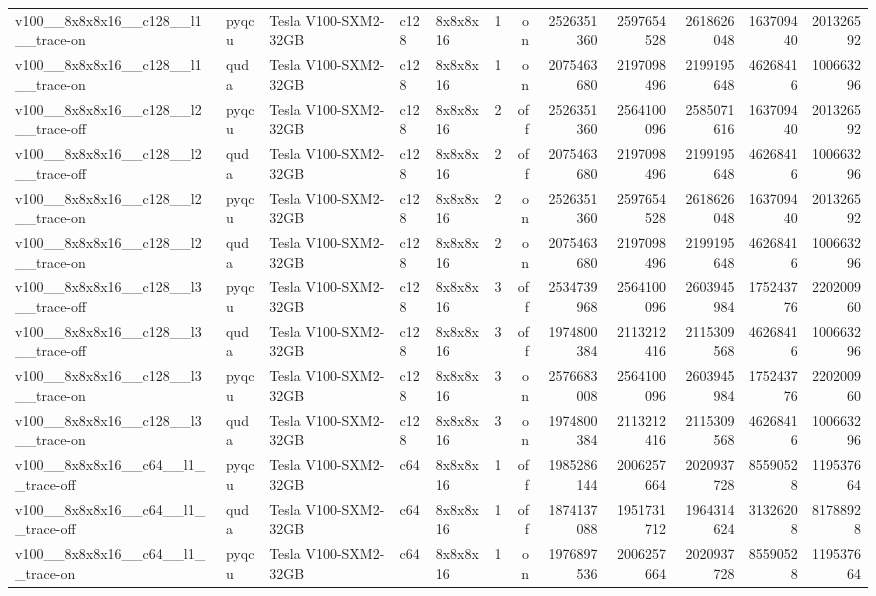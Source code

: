 \begin{table}[htbp]
\begin{tabular}{@{}lllllrrrrrrr@{}}
v100\_\_8x8x8x16\_\_c128\_\_l1\_\_trace-on & pyqcu & Tesla V100-SXM2-32GB & c128 & 8x8x8x16 & 1 & on & 2526351360 & 2597654528 & 2618626048 & 163709440 & 201326592 \\
v100\_\_8x8x8x16\_\_c128\_\_l1\_\_trace-on & quda & Tesla V100-SXM2-32GB & c128 & 8x8x8x16 & 1 & on & 2075463680 & 2197098496 & 2199195648 & 46268416 & 100663296 \\
v100\_\_8x8x8x16\_\_c128\_\_l2\_\_trace-off & pyqcu & Tesla V100-SXM2-32GB & c128 & 8x8x8x16 & 2 & off & 2526351360 & 2564100096 & 2585071616 & 163709440 & 201326592 \\
v100\_\_8x8x8x16\_\_c128\_\_l2\_\_trace-off & quda & Tesla V100-SXM2-32GB & c128 & 8x8x8x16 & 2 & off & 2075463680 & 2197098496 & 2199195648 & 46268416 & 100663296 \\
v100\_\_8x8x8x16\_\_c128\_\_l2\_\_trace-on & pyqcu & Tesla V100-SXM2-32GB & c128 & 8x8x8x16 & 2 & on & 2526351360 & 2597654528 & 2618626048 & 163709440 & 201326592 \\
v100\_\_8x8x8x16\_\_c128\_\_l2\_\_trace-on & quda & Tesla V100-SXM2-32GB & c128 & 8x8x8x16 & 2 & on & 2075463680 & 2197098496 & 2199195648 & 46268416 & 100663296 \\
v100\_\_8x8x8x16\_\_c128\_\_l3\_\_trace-off & pyqcu & Tesla V100-SXM2-32GB & c128 & 8x8x8x16 & 3 & off & 2534739968 & 2564100096 & 2603945984 & 175243776 & 220200960 \\
v100\_\_8x8x8x16\_\_c128\_\_l3\_\_trace-off & quda & Tesla V100-SXM2-32GB & c128 & 8x8x8x16 & 3 & off & 1974800384 & 2113212416 & 2115309568 & 46268416 & 100663296 \\
v100\_\_8x8x8x16\_\_c128\_\_l3\_\_trace-on & pyqcu & Tesla V100-SXM2-32GB & c128 & 8x8x8x16 & 3 & on & 2576683008 & 2564100096 & 2603945984 & 175243776 & 220200960 \\
v100\_\_8x8x8x16\_\_c128\_\_l3\_\_trace-on & quda & Tesla V100-SXM2-32GB & c128 & 8x8x8x16 & 3 & on & 1974800384 & 2113212416 & 2115309568 & 46268416 & 100663296 \\
v100\_\_8x8x8x16\_\_c64\_\_l1\_\_trace-off & pyqcu & Tesla V100-SXM2-32GB & c64 & 8x8x8x16 & 1 & off & 1985286144 & 2006257664 & 2020937728 & 85590528 & 119537664 \\
v100\_\_8x8x8x16\_\_c64\_\_l1\_\_trace-off & quda & Tesla V100-SXM2-32GB & c64 & 8x8x8x16 & 1 & off & 1874137088 & 1951731712 & 1964314624 & 31326208 & 81788928 \\
v100\_\_8x8x8x16\_\_c64\_\_l1\_\_trace-on & pyqcu & Tesla V100-SXM2-32GB & c64 & 8x8x8x16 & 1 & on & 1976897536 & 2006257664 & 2020937728 & 85590528 & 119537664 \\

\end{tabular}
\end{table}
